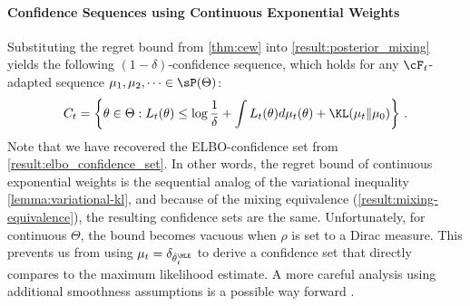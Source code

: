 \paragraph{Confidence Sequences using Continuous Exponential Weights} 
Substituting the regret bound from \cref{thm:cew} into \cref{result:posterior_mixing} yields the following $(1-\delta)$-confidence sequence, which holds for any $\cF_t$-adapted sequence $\mu_1,\mu_2, \dots \in \sP(\Theta)$:
\begin{align*}
    C_t  = \left\{ \theta \in \Theta: L_t(\theta) \leq  \log \frac{1}{\delta} + \int L_t(\theta) d\mu_t(\theta) + \KL(\mu_t \| \mu_0)\right\} \,.
\end{align*}
Note that we have recovered the ELBO-confidence set from \cref{result:elbo_confidence_set}. In other words, the regret bound of continuous exponential weights is the sequential analog of the variational inequality \cref{lemma:variational-kl}, and because of the mixing equivalence (\cref{result:mixing-equivalence}), the resulting confidence sets are the same. Unfortunately, for continuous $\Theta$, the bound becomes vacuous when $\rho$ is set to a Dirac measure. This prevents us from using $\mu_t = \delta_{\hat \theta_t^\MLE}$ to derive a confidence set that directly compares to the maximum likelihood estimate. A more careful analysis using additional smoothness assumptions is a possible way forward \citep[c.f.,][]{lee2024unified}.



